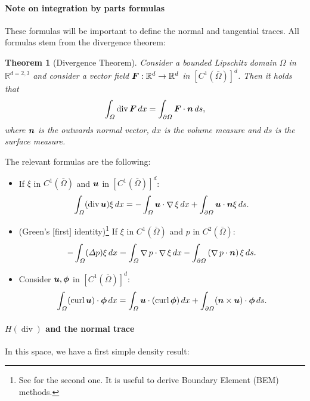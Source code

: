 \documentclass{article}
\renewcommand{\vec}{\vectorsym}
\DeclareMathOperator{\grad}{\nabla}
\DeclareMathOperator{\dive}{\text{div}}
\DeclareMathOperator{\curl}{\text{curl}}
\newcommand{\R}{\mathbb{R}}
\newtheorem{theorem}{Theorem}
\begin{document}
\paragraph{Note on integration by parts formulas} These formulas will be important to define the normal and tangential traces. All formulas stem from the divergence theorem: 

\begin{theorem}[Divergence Theorem]
    Consider a bounded Lipschitz domain $\Omega$ in $\R^{d=2,3}$ and consider a vector field $\vec F:\R^d \to \R^d$ in $[C^1(\bar\Omega)]^d$. Then it holds that
        $$ \int_\Omega \dive \vec F\,dx = \int_{\partial\Omega}\vec F\cdot \vec n\,ds,$$
    where $\vec n$ is the outwards normal vector, $dx$ is the volume measure and $ds$ is the surface measure.
\end{theorem}

The relevant formulas are the following: 
    \begin{itemize}
        \item If $\xi$ in $C^1(\bar\Omega)$ and $\vec u$ in $[C^1(\bar\Omega)]^d$:
            $$ \int_\Omega (\dive \vec u) \xi\,dx = -\int_\Omega\vec u\cdot \grad \xi\,dx + \int_{\partial\Omega} \vec u \cdot \vec n \xi\,ds.$$
        \item (Green's [first] identity)\footnote{See \cite{monk2003finite} for the second one. It is useful to derive Boundary Element (BEM) methods.} If $\xi$ in $C^1(\bar\Omega)$ and $p$ in $C^2(\bar\Omega)$:
            $$ -\int_\Omega (\Delta p) \xi\,dx = \int_\Omega\grad p\cdot \grad \xi\,dx - \int_{\partial\Omega}\left(\grad p\cdot \vec n\right)\xi\,ds.$$
        \item Consider $\vec u,\vec \phi$ in $[C^1(\bar\Omega)]^d$: 
            $$ \int_\Omega (\curl \vec u) \cdot \vec\phi\,dx = \int_\Omega \vec u \cdot (\curl \vec \phi)\,dx  + \int_{\partial\Omega}(\vec n\times \vec u)\cdot \vec\phi\,ds.$$
    \end{itemize}

\paragraph{$H(\dive)$ and the normal trace} In this space, we have a first simple density result: 
\end{document}
